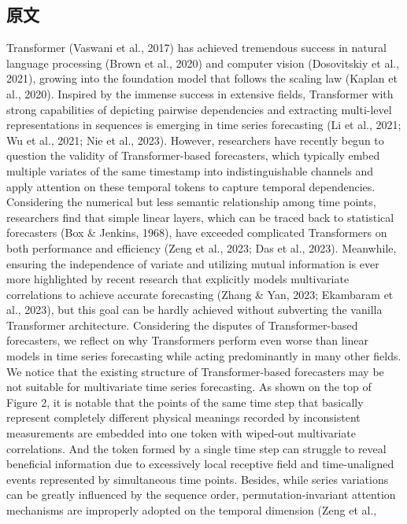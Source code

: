 \documentclass[twoside,12pt]{article}
\begin{document}
\subsection{原文}
Transformer (Vaswani et al., 2017) has achieved tremendous success in natural language processing (Brown et al., 2020) and computer vision (Dosovitskiy et al., 2021), growing into the foundation model that follows the scaling law (Kaplan et al., 2020). Inspired by the immense success in extensive
fields, Transformer with strong capabilities of depicting pairwise dependencies and extracting multi-level representations
in sequences is emerging in time series forecasting (Li et al.,
2021; Wu et al., 2021; Nie et al., 2023).
However, researchers have recently begun to question the validity of Transformer-based forecasters, which typically embed
multiple variates of the same timestamp into indistinguishable
channels and apply attention on these temporal tokens to capture temporal dependencies. Considering the numerical but
less semantic relationship among time points, researchers find
that simple linear layers, which can be traced back to statistical
forecasters (Box \& Jenkins, 1968), have exceeded complicated Transformers on both performance
and efficiency (Zeng et al., 2023; Das et al., 2023). Meanwhile, ensuring the independence of variate
and utilizing mutual information is ever more highlighted by recent research that explicitly models
multivariate correlations to achieve accurate forecasting (Zhang & Yan, 2023; Ekambaram et al.,
2023), but this goal can be hardly achieved without subverting the vanilla Transformer architecture.
Considering the disputes of Transformer-based forecasters, we reflect on why Transformers perform
even worse than linear models in time series forecasting while acting predominantly in many other
fields. We notice that the existing structure of Transformer-based forecasters may be not suitable for
multivariate time series forecasting. As shown on the top of Figure 2, it is notable that the points
of the same time step that basically represent completely different physical meanings recorded by
inconsistent measurements are embedded into one token with wiped-out multivariate correlations.
And the token formed by a single time step can struggle to reveal beneficial information due to
excessively local receptive field and time-unaligned events represented by simultaneous time points.
Besides, while series variations can be greatly influenced by the sequence order, permutation-invariant attention mechanisms are improperly adopted on the temporal dimension (Zeng et al.,
\end{document}
